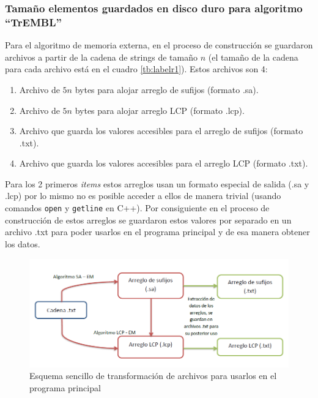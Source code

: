 \subsubsection{Tamaño elementos guardados en disco duro para algoritmo ``TrEMBL''}

Para el algoritmo de memoria externa, en el proceso de construcción se guardaron archivos a partir de la cadena de strings de tamaño $n$ (el tamaño de la cadena para cada archivo está en el cuadro \ref{tb:labelr1}). Estos archivos son 4:

\begin{enumerate}

\item Archivo de $5n$ bytes para alojar arreglo de sufijos (formato .sa).
\item Archivo de $5n$ bytes para alojar arreglo LCP (formato .lcp).
\item Archivo que guarda los valores accesibles para el arreglo de sufijos (formato .txt).
\item Archivo que guarda los valores accesibles para el arreglo LCP (formato .txt).

\end{enumerate}

Para los 2 primeros \textit{items} estos arreglos usan un formato especial de salida (.sa y .lcp) por lo mismo no es posible acceder a ellos de manera trivial (usando comandos \texttt{open} y \texttt{getline} en C++). Por consiguiente en el proceso de construcción de estos arreglos se guardaron estos valores por separado en un archivo .txt para poder usarlos en el programa principal y de esa manera obtener los datos.

\begin{figure}[h]
    \centering
    \includegraphics[width=1.0\textwidth]{./images/esquema_v1.PNG}
    \caption{Esquema sencillo de transformación de archivos para usarlos en el programa principal}
    \label{fig:imple1}
\end{figure}

